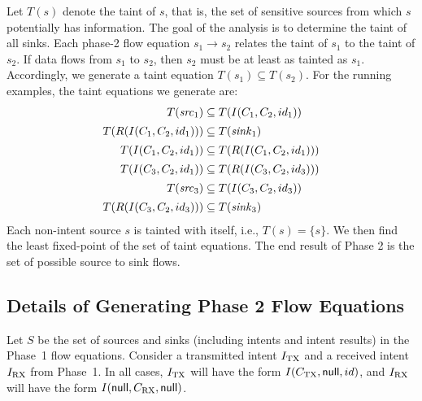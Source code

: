 \noindent
Let $T(s)$ denote the taint of $s$, that is, the set of sensitive sources from
which $s$ potentially has information. The goal of the analysis is to determine the taint of all sinks.
Each phase-2 flow equation $s_1 \to s_2$ relates the taint of $s_1$ to the taint of $s_2$. 
If data flows from $s_1$ to $s_2$, then $s_2$ must be at least as tainted as $s_1$.
Accordingly, we generate a taint equation $T(s_1) \subseteq T(s_2)$. For the running examples, the taint  equations we generate are:
\begin{align*}
T(\mathit{src}_1) & \subseteq T(I(C_1, C_2, id_1))
\\[0.4ex]
T(R(I(C_1, C_2, id_1))) & \subseteq T(\mathit{sink}_1)
\\[0.4ex]
T(I(C_1, C_2, id_1)) & \subseteq T(R(I(C_1, C_2, id_1)))
\\[0.4ex]
T(I(C_3, C_2, id_1)) & \subseteq T(R(I(C_3, C_2, id_3)))
\\[0.4ex]
T(\mathit{src}_3) & \subseteq T(I(C_3, C_2, id_3))
\\[0.4ex]
T(R(I(C_3, C_2, id_3))) & \subseteq T(\mathit{sink}_3)
\end{align*}
Each non-intent source $s$ is tainted with itself, i.e.,
$T(s) = \{s\}$.
We then find the least fixed-point of the set of taint equations.
The end result of Phase 2 is the set of possible source to sink flows.
\def\ismatch{is\_match}

\subsection{Details of Generating Phase 2 Flow Equations} \label{subsec:gen-phase2-eqs}
Let $S$ be the set of sources and sinks (including intents and intent results)
in the Phase~1 flow equations. 
%
Consider a transmitted intent $I_{\rm TX}$ and a received intent $I_{\rm RX}$ from Phase~1.
In all cases, $I_{\rm TX}$ will have the form $I(C_{\rm TX}, \textsf{null}, id)$, and
$I_{\rm RX}$ will have the form $I(\textsf{null}, C_{\rm RX}, \textsf{null})$.

